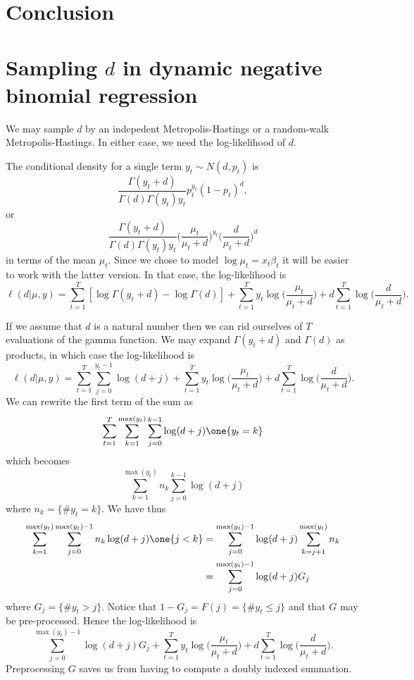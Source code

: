 \documentclass[11pt]{article}
\begin{document}
\section{Conclusion}

\appendix

\section{Sampling $d$ in dynamic negative binomial regression}
\label{sec:sample-d}

We may sample $d$ by an indepedent Metropolis-Hastings or a random-walk
Metropolis-Hastings.  In either case, we need the log-likelihood of $d$.

The conditional density for a single term $y_t \sim N(d, p_t)$ is
\[
\frac{\Gamma(y_t + d)}{\Gamma(d) \Gamma(y_t) y_t} p_t^{y_t} (1-p_t)^{d} ,
\]
or 
\[
\frac{\Gamma(y_t + d)}{\Gamma(d) \Gamma(y_t) y_t} 
\Big( \frac{\mu_t}{\mu_t + d} \Big)^{y_t} \Big( \frac{d}{\mu_t + d} \Big)^d
\]
in terms of the mean $\mu_t$.  Since we chose to model $\log \mu_t = x_t
\beta_t$ it will be easier to work with the latter version.  In that case, the
log-likelihood is
\[
\ell(d|\mu, y) = \sum_{t=1}^T [ \log \Gamma(y_t + d)  - \log \Gamma(d) ]  + 
\sum_{t=1}^T y_t \log \big( \frac{\mu_t}{\mu_t + d} \Big) +
d \sum_{t=1}^T \log \Big( \frac{d}{\mu_t + d} \Big).
\]

If we assume that $d$ is a natural number then we can rid ourselves of $T$
evaluations of the gamma function.  We may expand $\Gamma(y_t + d)$ and
$\Gamma(d)$ as products, in which case the log-likelihood is
\[
\ell(d|\mu, y) = \sum_{t=1}^T \sum_{j=0}^{y_t-1} \log(d + j) + 
\sum_{t=1}^T y_t \log \big( \frac{\mu_t}{\mu_t + d} \Big) +
d \sum_{t=1}^T \log \Big( \frac{d}{\mu_t + d} \Big).
\]
We can rewrite the first term of the sum as
\[
\sum_{t=1}^T \sum_{k=1}^{\max(y_t)} \sum_{j=0}^{k-1} \log(d+j) \one \{y_t = k\}
\]
which becomes
\[
\sum_{k=1}^{\max(y_t)} n_k \sum_{j=0}^{k-1} \log(d+j)
\]
where $n_k = \{ \# y_t = k \}$.  We have thus
\begin{align*}
\sum_{k=1}^{\max(y_t)} \sum_{j=0}^{\max(y_t)-1} n_k \log(d+j) \one\{j < k\}
& = 
\sum_{j=0}^{\max(y_t)-1} \log(d+j) \sum_{k=j+1}^{\max(y_t)} n_k \\
& = \sum_{j=0}^{\max(y_t)-1} \log(d+j) G_j
\end{align*}
where $G_j = \{ \# y_t > j \}$.  Notice that $1-G_j = F(j) = \{\# y_t \leq j\}$
and that $G$ may be pre-processed.  Hence the log-likelihood is
\[
\sum_{j=0}^{\max(y_t)-1} \log(d+j) G_j + 
\sum_{t=1}^T y_t \log \big( \frac{\mu_t}{\mu_t + d} \Big) +
d \sum_{t=1}^T \log \Big( \frac{d}{\mu_t + d} \Big).
\]
Preprocessing $G$ saves us from having to compute a doubly indexed summation.


{}

\end{document}
